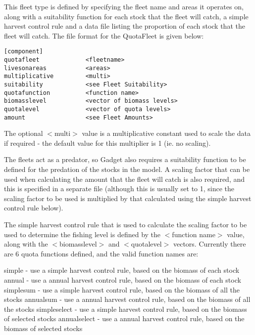 \documentclass[10pt,twoside]{book}
\begin{document}
\bigskip
This fleet type is defined by specifying the fleet name and areas it operates on, along with a suitability function for each stock that the fleet will catch, a simple harvest control rule and a data file listing the proportion of each stock that the fleet will catch.  The file format for the QuotaFleet is given below:

{\small\begin{verbatim}
[component]
quotafleet             <fleetname>
livesonareas           <areas>
multiplicative         <multi>
suitability            <see Fleet Suitability>
quotafunction          <function name>
biomasslevel           <vector of biomass levels>
quotalevel             <vector of quota levels>
amount                 <see Fleet Amounts>
\end{verbatim}}

The optional $<$multi$>$ value is a multiplicative constant used to scale the data if required - the default value for this multiplier is 1 (ie. no scaling).

\bigskip
The fleets act as a predator, so Gadget also requires a suitability function to be defined for the predation of the stocks in the model.  A scaling factor that can be used when calculating the amount that the fleet will catch is also required, and this is specified in a separate file (although this is usually set to 1, since the scaling factor to be used is multiplied by that calculated using the simple harvest control rule below).

\bigskip
The simple harvest control rule that is used to calculate the scaling factor to be used to determine the fishing level is defined by the $<$function name$>$ value, along with the $<$biomasslevel$>$ and $<$quotalevel$>$ vectors.  Currently there are 6 quota functions defined, and the valid function names are:

\bigskip
simple - use a simple harvest control rule, based on the biomass of each stock\newline
annual - use a annual harvest control rule, based on the biomass of each stock\newline
simplesum - use a simple harvest control rule, based on the biomass of all the stocks\newline
annualsum - use a annual harvest control rule, based on the biomass of all the stocks\newline
simpleselect - use a simple harvest control rule, based on the biomass of selected stocks\newline
annualselect - use a annual harvest control rule, based on the biomass of selected stocks
\end{document}
